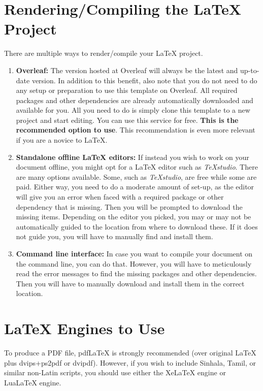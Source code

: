 \documentclass[12pt]{uomthesis}
\begin{document}
\section{Rendering/Compiling the \LaTeX{} Project}
\label{Sec:Intro:Render}
There are multiple ways to render/compile your \LaTeX{} project. 
\begin{enumerate}
    \item \textbf{Overleaf:} The version hosted at Overleaf will always be the latest and up-to-date version. In addition to this benefit, also note that you do not need to do any setup or preparation to use this template on Overleaf. All required packages and other dependencies are already automatically downloaded and available for you. All you need to do is simply clone this template to a new project and start editing. You can use this service for free. \textbf{This is the recommended option to use}. This recommendation is even more relevant if you are a novice to \LaTeX.
    \item \textbf{Standalone offline \LaTeX{} editors:} If instead you wish to work on your document offline, you might opt for a \LaTeX{} editor such as \textit{TeXstudio}. There are many options available. Some, such as \textit{TeXstudio}, are free while some are paid. Either way, you need to do a moderate amount of set-up, as the editor will give you an error when faced with a required package or other dependency that is missing. Then you will be prompted to download the missing items. Depending on the editor you picked, you may or may not be automatically guided to the location from where to download these. If it does not guide you, you will have to manually find and install them.
    \item \textbf{Command line interface:} In case you want to compile your document on the command line,
    you can do that. However, you will have to meticulously read the error messages to find the missing packages and other dependencies. Then you will have to manually download and install them in the correct location. 
\end{enumerate}


\section{\LaTeX{} Engines to Use}
\label{Sec:Intro:Engine}
To produce a PDF file, pdf\LaTeX{} is strongly recommended (over original \LaTeX{} plus dvips+ps2pdf or dvipdf). However, if you wish to include Sinhala, Tamil, or similar non-Latin scripts, you should use either the Xe\LaTeX{} engine or Lua\LaTeX{} engine.
\end{document}
